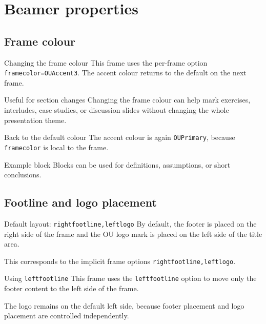 \documentclass[10pt,aspectratio=169]{beamer}
\begin{document}
\section{Beamer properties}
\subsection{Frame colour}
\begin{frame}[framecolor=OUAccent3]{Changing the frame colour}
This frame uses the per-frame option \texttt{framecolor=OUAccent3}. The accent colour returns to the default on the next frame.

\begin{block}{Useful for section changes}
Changing the frame colour can help mark exercises, interludes, case studies, or discussion slides without changing the whole presentation theme.
\end{block}
\end{frame}

\begin{frame}[t]{Back to the default colour}
The accent colour is again \texttt{OUPrimary}, because \texttt{framecolor} is local to the frame.

\begin{exampleblock}{Example block}
Blocks can be used for definitions, assumptions, or short conclusions.
\end{exampleblock}
\end{frame}

\subsection{Footline and logo placement}
\begin{frame}[t]{Default layout: \texttt{rightfootline,leftlogo}}
By default, the footer is placed on the right side of the frame and the OU logo mark is placed on the left side of the title area.

This corresponds to the implicit frame options \texttt{rightfootline,leftlogo}.
\end{frame}

\begin{frame}[t,leftfootline]{Using \texttt{leftfootline}}
This frame uses the \texttt{leftfootline} option to move only the footer content to the left side of the frame.

The logo remains on the default left side, because footer placement and logo placement are controlled independently.
\end{frame}
\end{document}
